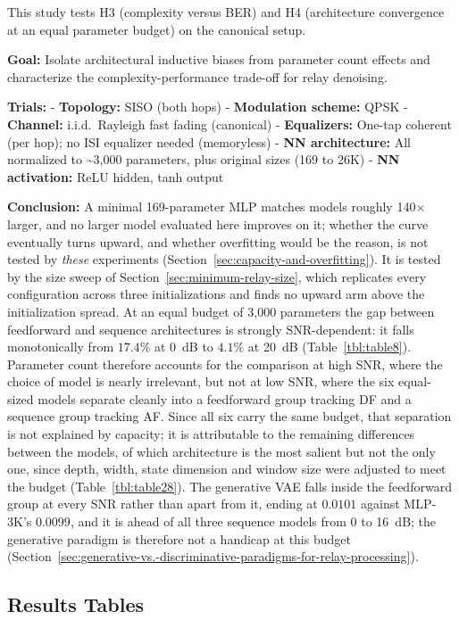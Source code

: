 This study tests H3 (complexity versus BER) and H4 (architecture convergence at an equal parameter budget) on the canonical setup.

\textbf{Goal:} Isolate architectural inductive biases from parameter count effects and characterize the complexity-performance trade-off for relay denoising.

\textbf{Trials:} - \textbf{Topology:} SISO (both hops) - \textbf{Modulation scheme:} QPSK - \textbf{Channel:} i.i.d.\ Rayleigh fast fading (canonical) - \textbf{Equalizers:} One-tap coherent (per hop); no ISI equalizer needed (memoryless) - \textbf{NN architecture:} All normalized to \textasciitilde3,000 parameters, plus original sizes (169 to 26K) - \textbf{NN activation:} ReLU hidden, tanh output

\textbf{Conclusion:} A minimal 169-parameter MLP matches models roughly 140$\times$ larger, and no larger model evaluated here improves on it; whether the curve eventually turns upward, and whether overfitting would be the reason, is not tested by \emph{these} experiments (Section~\ref{sec:capacity-and-overfitting}). It is tested by the size sweep of Section~\ref{sec:minimum-relay-size}, which replicates every configuration across three initializations and finds no upward arm above the initialization spread. At an equal budget of 3,000 parameters the gap between feedforward and sequence architectures is strongly SNR-dependent: it falls monotonically from $17.4\%$ at 0~dB to $4.1\%$ at 20~dB (Table~\ref{tbl:table8}). Parameter count therefore accounts for the comparison at high SNR, where the choice of model is nearly irrelevant, but not at low SNR, where the six equal-sized models separate cleanly into a feedforward group tracking DF and a sequence group tracking AF. Since all six carry the same budget, that separation is not explained by capacity; it is attributable to the remaining differences between the models, of which architecture is the most salient but not the only one, since depth, width, state dimension and window size were adjusted to meet the budget (Table~\ref{tbl:table28}). The generative VAE falls inside the feedforward group at every SNR rather than apart from it, ending at $0.0101$ against MLP-3K's $0.0099$, and it is ahead of all three sequence models from 0 to 16~dB; the generative paradigm is therefore not a handicap at this budget (Section~\ref{sec:generative-vs.-discriminative-paradigms-for-relay-processing}).

\subsection{Results Tables}\label{sec:results-tables-2}

